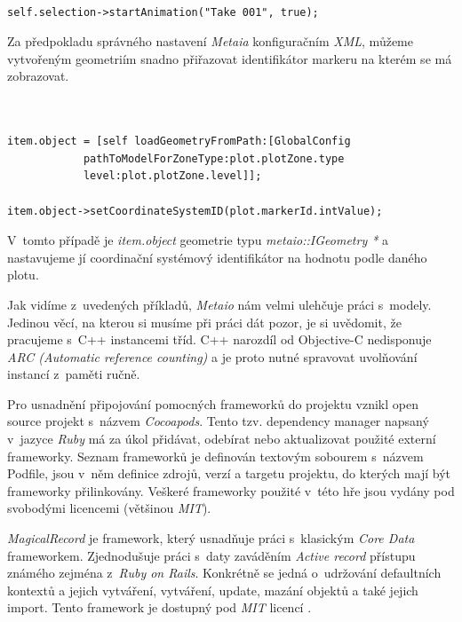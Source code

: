 \documentclass[twoside,12pt]{article}
\begin{document}
\begin{verbatim}

self.selection->startAnimation("Take 001", true);

\end{verbatim}

Za předpokladu správného nastavení \textit{Metaia} konfiguračním \textit{XML}, můžeme vytvořeným geometriím snadno přiřazovat identifikátor markeru na kterém se má zobrazovat.

\begin{verbatim}


item.object = [self loadGeometryFromPath:[GlobalConfig 
			pathToModelForZoneType:plot.plotZone.type 
			level:plot.plotZone.level]];
				
item.object->setCoordinateSystemID(plot.markerId.intValue);

\end{verbatim}

V~tomto případě je \textit{item.object} geometrie typu \textit{metaio::IGeometry *} a nastavujeme jí coordinační systémový identifikátor na hodnotu podle daného plotu. 

Jak vidíme z~uvedených příkladů, \textit{Metaio} nám velmi ulehčuje práci s~modely. Jedinou věcí, na kterou si musíme při práci dát pozor, je si uvědomit, že pracujeme s~C++ instancemi tříd. C++ narozdíl od Objective-C nedisponuje \textit{ARC (Automatic reference counting)} a je proto nutné spravovat uvolňování instancí z~paměti ručně.

Pro usnadnění připojování pomocných frameworků do projektu vznikl open source projekt s~názvem \textit{Cocoapods}. Tento tzv. dependency manager napsaný v~jazyce \textit{Ruby} má za úkol přidávat, odebírat nebo aktualizovat použité externí frameworky. Seznam frameworků je definován textovým sobourem s~názvem Podfile, jsou v~něm definice zdrojů, verzí a targetu projektu, do kterých mají být frameworky přilinkovány. Veškeré frameworky použité v~této hře jsou vydány pod svobodými licencemi (většinou \textit{MIT}).

\textit{MagicalRecord} je framework, který usnadňuje práci s~klasickým \textit{Core Data} frameworkem. Zjednodušuje práci s~daty zaváděním \textit{Active record} přístupu známého zejména z~\textit{Ruby on Rails}. Konkrétně se jedná o~udržování defaultních kontextů a jejich vytváření, vytváření, update, mazání objektů a také jejich import. Tento framework je dostupný pod \textit{MIT} licencí \cite{magical_record}.
\end{document}
